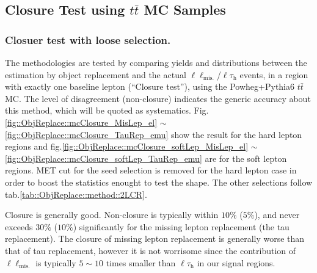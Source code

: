 %



\clearpage
\subsection{Closure Test using $t\bar{t}$ MC Samples} \label{sec::ObjReplace::mcClosure}
%
\subsubsection{Closuer test with loose selection.} \label{sec::ObjReplace::mcClosure_loose} 
The methodologies are tested by comparing yields and distributions between the estimation by object replacement and the actual $\ell\ell_{\mathrm{mis.}}$/$\ell\tau_{\mathrm{h}}$ events, in a region with exactly one baseline lepton (``Closure test''), using the Powheg+Pythia6 $t\bar{t}$ MC. The level of disagreement (non-closure) indicates the generic accuracy about this method, which will be quoted as systematics. Fig.\ref{fig::ObjReplace::mcClosure_MisLep_el} $\sim$ \ref{fig::ObjReplace::mcClosure_TauRep_emu} show the result for the hard lepton regions and fig.\ref{fig::ObjReplace::mcClosure_softLep_MisLep_el} $\sim$ \ref{fig::ObjReplace::mcClosure_softLep_TauRep_emu} are for the soft lepton regions. MET cut for the seed selection is removed for the hard lepton case in order to boost the statistics enought to test the shape. The other selections follow tab.\ref{tab::ObjReplace::method::2LCR}.








%

Closure is generally good. Non-closure is typically within $10\%$ ($5\%$), and never exceeds $30\%$ ($10\%$) significantly for the missing lepton replacement (the tau replacement).
The closure of missing lepton replacement is generally worse than that of tau replacement, however it is not worrisome since the contribution of $\ell\ell_{\mathrm{mis.}}$ is typically $5\sim10$ times smaller than $\ell\tau_{\mathrm{h}}$ in our signal regions. \\



